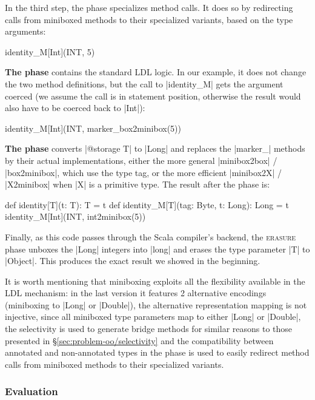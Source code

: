 In the third step, the \inject{} phase specializes method calls. It does so by redirecting calls from miniboxed methods to their specialized variants, based on the type arguments:

\begin{lstlisting-nobreak}
 identity_M[Int](INT, 5)
\end{lstlisting-nobreak}

\textbf{The \coerce{} phase} contains the standard LDL logic. In our example, it does not change the two method definitions, but the call to |identity_M| gets the argument coerced (we assume the call is in statement position, otherwise the result would also have to be coerced back to |Int|):

\begin{lstlisting-nobreak}
 identity_M[Int](INT, marker_box2minibox(5))
\end{lstlisting-nobreak}

\textbf{The \commit{} phase} converts |@storage T| to |Long| and replaces the |marker_| methods by their actual implementations, either the more general |minibox2box| / |box2minibox|, which use the type tag, or the more efficient |minibox2X| / |X2minibox| when |X| is a primitive type. The result after the \commit{} phase is:

\begin{lstlisting-nobreak}
 def identity[T](t: T): T = t
 def identity_M[T](tag: Byte, t: Long): Long = t
 identity_M[Int](INT, int2minibox(5))
\end{lstlisting-nobreak}

Finally, as this code passes through the Scala compiler's backend, the \textsc{erasure} phase unboxes the |Long| integers into |long| and erases the type parameter |T| to |Object|. This produces the exact result we showed in the beginning.

It is worth mentioning that miniboxing exploits all the flexibility available in the LDL mechanism: in the last version it features 2 alternative encodings (miniboxing to |Long| or |Double|), the alternative representation mapping is not injective, since all miniboxed type parameters map to either |Long| or |Double|, the selectivity is used to generate bridge methods for similar reasons to those presented in \S\ref{sec:problem-oo/selectivity} and the compatibility between annotated and non-annotated types in the \inject{} phase is used to easily redirect method calls from miniboxed methods to their specialized variants.

\subsubsection{Evaluation}

